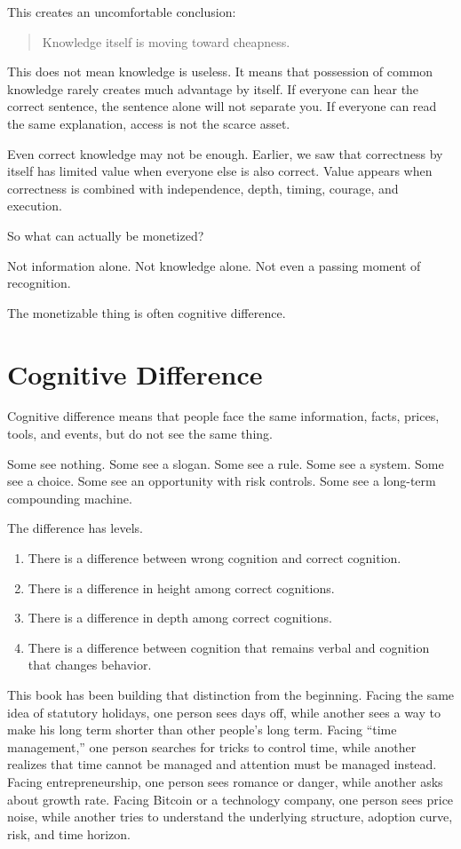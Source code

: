 This creates an uncomfortable conclusion:

\begin{quote}
Knowledge itself is moving toward cheapness.
\end{quote}

This does not mean knowledge is useless. It means that possession of common knowledge rarely creates much advantage by itself. If everyone can hear the correct sentence, the sentence alone will not separate you. If everyone can read the same explanation, access is not the scarce asset.

Even correct knowledge may not be enough. Earlier, we saw that correctness by itself has limited value when everyone else is also correct. Value appears when correctness is combined with independence, depth, timing, courage, and execution.

So what can actually be monetized?

Not information alone. Not knowledge alone. Not even a passing moment of recognition.

The monetizable thing is often cognitive difference.

\section*{Cognitive Difference}

Cognitive difference means that people face the same information, facts, prices, tools, and events, but do not see the same thing.

Some see nothing. Some see a slogan. Some see a rule. Some see a system. Some see a choice. Some see an opportunity with risk controls. Some see a long-term compounding machine.

The difference has levels.

\begin{enumerate}
\item There is a difference between wrong cognition and correct cognition.
\item There is a difference in height among correct cognitions.
\item There is a difference in depth among correct cognitions.
\item There is a difference between cognition that remains verbal and cognition that changes behavior.
\end{enumerate}

This book has been building that distinction from the beginning. Facing the same idea of statutory holidays, one person sees days off, while another sees a way to make his long term shorter than other people's long term. Facing ``time management,'' one person searches for tricks to control time, while another realizes that time cannot be managed and attention must be managed instead. Facing entrepreneurship, one person sees romance or danger, while another asks about growth rate. Facing Bitcoin or a technology company, one person sees price noise, while another tries to understand the underlying structure, adoption curve, risk, and time horizon.

